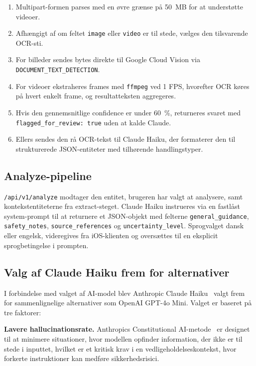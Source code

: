 \begin{enumerate}
  \item Multipart-formen parses med en øvre grænse på 50~MB for at understøtte videoer.
  \item Afhængigt af om feltet \texttt{image} eller \texttt{video} er til stede, vælges den tilsvarende OCR-sti.
  \item For billeder sendes bytes direkte til Google Cloud Vision via \texttt{DOCUMENT\_TEXT\_DETECTION}.
  \item For videoer ekstraheres frames med \texttt{ffmpeg} ved 1 FPS, hvorefter OCR køres på hvert enkelt frame, og resultatteksten aggregeres.
  \item Hvis den gennemsnitlige confidence er under 60~\%, returneres svaret med \texttt{flagged\_for\_review: true} uden at kalde Claude.
  \item Ellers sendes den rå OCR-tekst til Claude Haiku, der formaterer den til strukturerede JSON-entiteter med tilhørende handlingstyper.
\end{enumerate}

\subsection{Analyze-pipeline}
\label{subsec:analyze}

\texttt{/api/v1/analyze} modtager den entitet, brugeren har valgt at analysere, samt kontekstentiteterne fra extract-steget. Claude Haiku instrueres via en fastlåst system-prompt til at returnere et JSON-objekt med felterne \texttt{general\_guidance}, \texttt{safety\_notes}, \texttt{source\_references} og \texttt{uncertainty\_level}. Sprogvalget dansk eller engelsk, videregives fra iOS-klienten og oversættes til en eksplicit sprogbetingelse i prompten.

\subsection{Valg af Claude Haiku frem for alternativer}
\label{subsec:claude-valg}

I forbindelse med valget af AI-model blev Anthropic Claude Haiku~\cite{anthropic_claude} valgt frem for sammenlignelige alternativer som OpenAI GPT-4o Mini. Valget er baseret på tre faktorer:

\textbf{Lavere hallucinationsrate.} Anthropics Constitutional AI-metode~\cite{anthropic_claude} er designet til at minimere situationer, hvor modellen opfinder information, der ikke er til stede i inputtet, hvilket er et kritisk krav i en vedligeholdelseskontekst, hvor forkerte instruktioner kan medføre sikkerhedsrisici.

